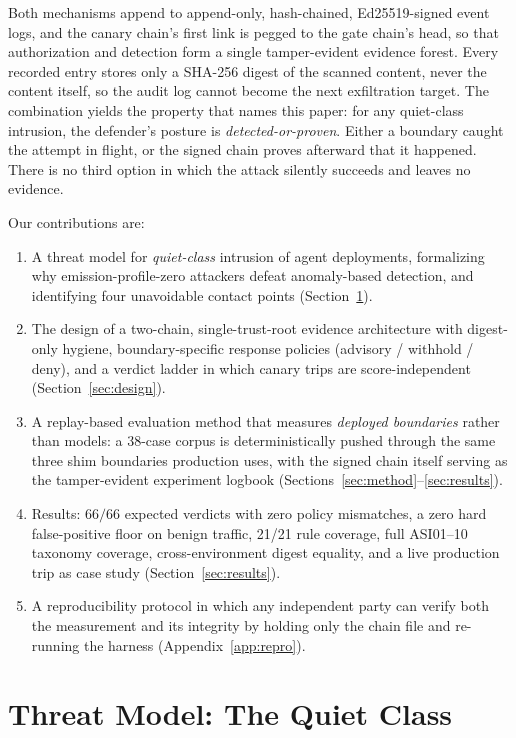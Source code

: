 \documentclass[11pt,a4paper]{article}
\begin{document}
Both mechanisms append to append-only, hash-chained, Ed25519-signed event
logs, and the canary chain's first link is pegged to the gate chain's head,
so that authorization and detection form a single tamper-evident evidence
forest. Every recorded entry stores only a SHA-256 digest of the scanned
content, never the content itself, so the audit log cannot become the next
exfiltration target. The combination yields the property that names this
paper: for any quiet-class intrusion, the defender's posture is
\emph{detected-or-proven}. Either a boundary caught the attempt in flight,
or the signed chain proves afterward that it happened. There is no third
option in which the attack silently succeeds and leaves no evidence.

Our contributions are:

\begin{enumerate}[leftmargin=1.8em, itemsep=0.15em]
  \item A threat model for \emph{quiet-class} intrusion of agent deployments,
  formalizing why emission-profile-zero attackers defeat anomaly-based
  detection, and identifying four unavoidable contact points
  (Section~\ref{sec:threat}).
  \item The design of a two-chain, single-trust-root evidence architecture
  with digest-only hygiene, boundary-specific response policies
  (advisory / withhold / deny), and a verdict ladder in which canary trips are
  score-independent (Section~\ref{sec:design}).
  \item A replay-based evaluation method that measures \emph{deployed
  boundaries} rather than models: a 38-case corpus is deterministically pushed
  through the same three shim boundaries production uses, with the signed
  chain itself serving as the tamper-evident experiment logbook
  (Sections~\ref{sec:method}--\ref{sec:results}).
  \item Results: $66/66$ expected verdicts with zero policy mismatches, a
  zero hard false-positive floor on benign traffic, 21/21 rule coverage, full
  ASI01--10 taxonomy coverage, cross-environment digest equality, and a live
  production trip as case study (Section~\ref{sec:results}).
  \item A reproducibility protocol in which any independent party can verify
  both the measurement and its integrity by holding only the chain file and
  re-running the harness (Appendix~\ref{app:repro}).
\end{enumerate}

\section{Threat Model: The Quiet Class}\label{sec:threat}
\end{document}
